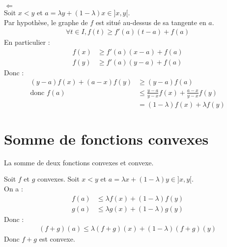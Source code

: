 \documentclass[../main.tex]{subfiles}
\begin{document}
$\boxed{\Leftarrow}$ \\
Soit $x < y$ et $a = \lambda y + (1-\lambda)x \in ]x, y[$. \\
Par hypothèse, le graphe de $f$ est situé au-dessus de sa tangente en $a$. 
\begin{align*}
    \forall t \in I, f(t) \geq f'(a)(t-a) + f(a)
\end{align*}
En particulier :
\begin{align*}
    f(x) &\geq f'(a)(x-a) + f(a) \\
    f(y) &\geq f'(a)(y-a) + f(a)
\end{align*}
Donc : 
\begin{align*}
    (y-a)f(x) + (a-x)f(y) &\geq (y-a)f(a) \\
    \text{donc } f(a) &\leq \frac{y-a}{y-x}f(x) + \frac{a-x}{y-x}f(y) \\
    &= (1-\lambda)f(x) + \lambda f(y)
\end{align*}

\section{Somme de fonctions convexes}
\begin{tcolorbox}[title=Propostion 19.17, title filled=false, colframe=lightblue, colback=lightblue!10!white]
    La somme de deux fonctions convexes et convexe. 
\end{tcolorbox}

\noindent Soit $f$ et $g$ convexes. Soit $x < y$ et $a = \lambda x + (1-\lambda)y \in ]x, y[$. \\
On a :
\begin{align*}
    f(a) &\leq \lambda f(x) + (1-\lambda)f(y) \\
    g(a) &\leq \lambda g(x) + (1-\lambda)g(y)
\end{align*}
Donc :
\begin{align*}
    (f+g)(a) \leq \lambda (f+g)(x) + (1-\lambda)(f+g)(y)
\end{align*}
Donc $f+g$ est convexe.
\end{document}
